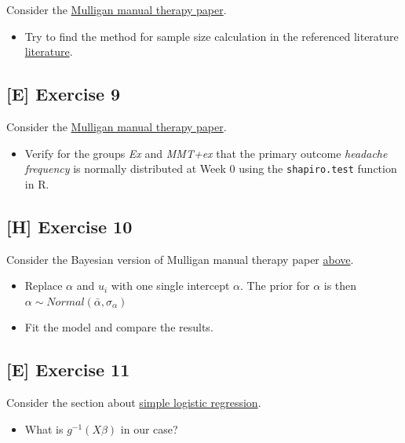 \documentclass[
]{book}
\providecommand{\tightlist}{%
  \setlength{\itemsep}{0pt}\setlength{\parskip}{0pt}}
\begin{document}
Consider the \hyperref[mulligan]{Mulligan manual therapy paper}.

\begin{itemize}
\tightlist
\item
  Try to find the method for sample size calculation in the
  referenced literature \href{https://journals.sagepub.com/doi/epub/10.1177/0333102417738202}{literature}.
\end{itemize}

\subsection{{[}E{]} Exercise 9}\label{exercise9_LMM}

Consider the \hyperref[mulligan]{Mulligan manual therapy paper}.

\begin{itemize}
\tightlist
\item
  Verify for the groups \emph{Ex} and \emph{MMT+ex} that the primary outcome \emph{headache frequency}
  is normally distributed at Week \(0\) using the \texttt{shapiro.test} function in R.
\end{itemize}

\subsection{{[}H{]} Exercise 10}\label{exercise10_LMM}

Consider the Bayesian version of Mulligan manual therapy paper \hyperref[mulligan_bayesian]{above}.

\begin{itemize}
\tightlist
\item
  Replace \(\alpha\) and \(u_i\) with one single intercept \(\alpha\).
  The prior for \(\alpha\) is then \(\alpha \sim Normal(\bar{\alpha}, \sigma_{\alpha})\)
\item
  Fit the model and compare the results.
\end{itemize}

\subsection{{[}E{]} Exercise 11}\label{exercise11_LMM}

Consider the section about \hyperref[simple_logistic_regression]{simple logistic regression}.

\begin{itemize}
\tightlist
\item
  What is \(g^{-1}(X \beta)\) in our case?
\end{itemize}
\end{document}
